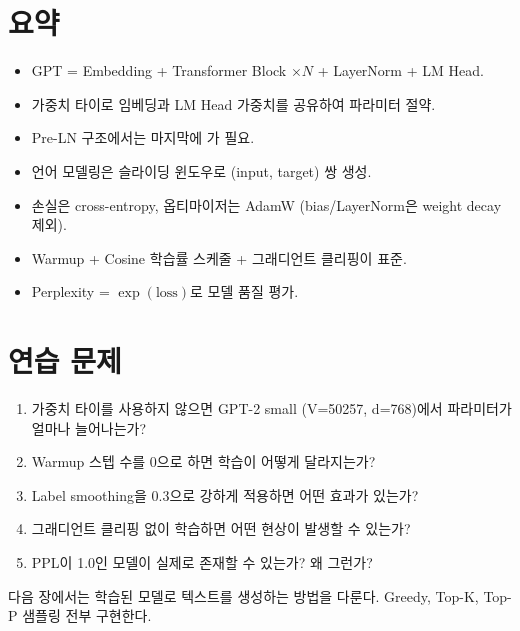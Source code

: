 \section{요약}

\begin{itemize}
  \item GPT = Embedding + Transformer Block $\times N$ + LayerNorm + LM Head.
  \item 가중치 타이로 임베딩과 LM Head 가중치를 공유하여 파라미터 절약.
  \item Pre-LN 구조에서는 마지막에 가 필요.
  \item 언어 모델링은 슬라이딩 윈도우로 (input, target) 쌍 생성.
  \item 손실은 cross-entropy, 옵티마이저는 AdamW (bias/LayerNorm은 weight decay 제외).
  \item Warmup + Cosine 학습률 스케줄 + 그래디언트 클리핑이 표준.
  \item Perplexity = $\exp(\text{loss})$로 모델 품질 평가.
\end{itemize}

\section{연습 문제}

\begin{enumerate}
  \item 가중치 타이를 사용하지 않으면 GPT-2 small (V=50257, d=768)에서 파라미터가 얼마나 늘어나는가?
  \item Warmup 스텝 수를 0으로 하면 학습이 어떻게 달라지는가?
  \item Label smoothing을 0.3으로 강하게 적용하면 어떤 효과가 있는가?
  \item 그래디언트 클리핑 없이 학습하면 어떤 현상이 발생할 수 있는가?
  \item PPL이 1.0인 모델이 실제로 존재할 수 있는가? 왜 그런가?
\end{enumerate}

다음 장에서는 학습된 모델로 텍스트를 생성하는 방법을 다룬다. Greedy, Top-K, Top-P 샘플링 전부 구현한다.
